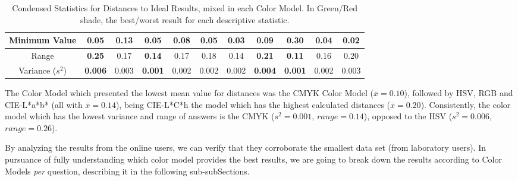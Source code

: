 \begin{table}[htbp]
{\begin{tabular}{@{}ccccccccccc@{}}
    \multicolumn{1}{c|}{Minimum Value}                                                 & 0.05  & 0.13       & 0.05                                   & 0.08  & \multicolumn{1}{c|}{0.05}                                  & 0.03                                  & 0.09       & 0.30                                   & 0.04                                  & \multicolumn{1}{c|}{0.02}  \\ \midrule
    \multicolumn{1}{c|}{Range}                                                         & \cellcolor[HTML]{FD6864}\textbf{0.25}  & 0.17       & \cellcolor[HTML]{32CB00}\textbf{0.14}  & 0.17  & \multicolumn{1}{c|}{0.18}                                  & 0.14                                  & \cellcolor[HTML]{FD6864}\textbf{0.21}       & \cellcolor[HTML]{32CB00}\textbf{0.11}  & 0.16                                  & \multicolumn{1}{c|}{0.20}  \\ \midrule
    \multicolumn{1}{c|}{Variance ($s^2$)}                                                      & \cellcolor[HTML]{FD6864}\textbf{0.006} & 0.003      & \cellcolor[HTML]{32CB00}\textbf{0.001} & 0.002 & \multicolumn{1}{c|}{0.002}                                 & 0.002                                 & \cellcolor[HTML]{FD6864}\textbf{0.004}      & \cellcolor[HTML]{32CB00}\textbf{0.001} & 0.002                                 & \multicolumn{1}{c|}{0.003} \\ \bottomrule
  \end{tabular}}
  \caption[Condensed Statistics for Distances to Ideal Results, mixed in each Color Model.]{Condensed Statistics for Distances to Ideal Results, mixed in each Color Model. In Green/Red shade, the best/worst result for each descriptive statistic.}
  \vspace{-5pt}
  \label{table:colormodels_distances_labonline_statistics}
\end{table}
%
The Color Model which presented the lowest mean value for distances was the CMYK Color Model ($\overline{x} = 0.10$), followed by HSV, RGB and CIE-L*a*b* (all with $\overline{x} = 0.14$), being
CIE-L*C*h the model which has the highest calculated distances ($\overline{x} = 0.20$). Consistently, the color model which has the lowest variance and range of answers is the CMYK ($s^2 = 0.001$,
$range = 0.14$), opposed to the HSV ($s^2 = 0.006$, $range = 0.26$). \par
%
By analyzing the results from the online users, we can verify that they corroborate the smallest data set (from laboratory users). In pursuance of fully understanding which color model provides the best results,
we are going to break down the results according to Color Models \emph{per} question, describing it in the following sub-subSections. \par
%
%
